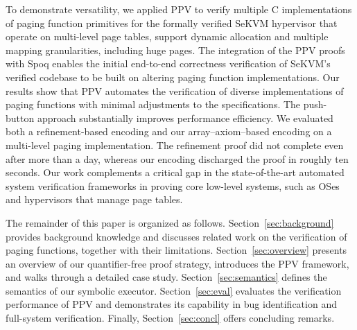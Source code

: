 
To demonstrate versatility, we applied PPV to verify multiple C implementations of paging function primitives for the formally verified SeKVM hypervisor that operate on multi-level page tables, support dynamic allocation and multiple mapping granularities, including huge pages. The integration of the PPV proofs with Spoq enables the initial end-to-end correctness verification of SeKVM’s verified codebase to be built on altering paging function implementations.
Our results show that PPV automates the verification of diverse implementations of paging functions with minimal adjustments to the specifications. The push-button approach substantially improves performance efficiency. We evaluated both a refinement-based encoding and our array–axiom–based encoding on a multi-level paging implementation. The refinement proof did not complete even after more than a day, whereas our encoding discharged the proof in roughly ten seconds. %
Our work complements a critical gap in the state-of-the-art automated system verification frameworks in proving core low-level systems, such as OSes and hypervisors that manage page tables.

The remainder of this paper is organized as follows. Section~\ref{sec:background} provides background knowledge and discusses related work on the verification of paging functions, together with their limitations. Section~\ref{sec:overview} presents an overview of our quantifier-free proof strategy, introduces the PPV framework, and walks through a detailed case study. Section~\ref{sec:semantics} defines the semantics of our symbolic executor. Section~\ref{sec:eval} evaluates the verification performance of PPV and demonstrates its capability in bug identification and full-system verification. Finally, Section~\ref{sec:concl} offers concluding remarks.

